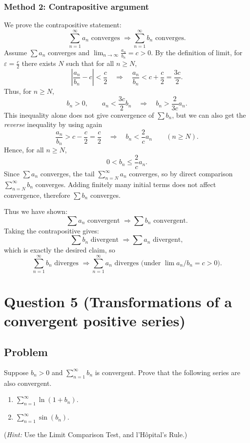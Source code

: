 \documentclass[12pt]{article}
\newcommand{\ds}{\displaystyle}
\begin{document}
\subsubsection*{Method 2: Contrapositive argument}
We prove the contrapositive statement:
\[
\sum_{n=1}^\infty a_n \text{ converges } \Longrightarrow \sum_{n=1}^\infty b_n \text{ converges}.
\]
Assume \(\sum a_n\) converges and \(\lim_{n\to\infty}\frac{a_n}{b_n}=c>0\).
By the definition of limit, for \(\varepsilon=\frac{c}{2}\) there exists \(N\) such that for all \(n\ge N\),
\[
\left|\frac{a_n}{b_n}-c\right|<\frac{c}{2}
\quad\Longrightarrow\quad
\frac{a_n}{b_n}<c+\frac{c}{2}=\frac{3c}{2}.
\]
Thus, for \(n\ge N\),
\[
b_n >0,\qquad a_n < \frac{3c}{2} b_n
\quad\Longrightarrow\quad
b_n > \frac{2}{3c} a_n.
\]
This inequality alone does not give convergence of \(\sum b_n\), but we can also get the \emph{reverse} inequality by using again
\[
\frac{a_n}{b_n}>c-\frac{c}{2}=\frac{c}{2}
\quad\Longrightarrow\quad
b_n < \frac{2}{c}a_n \qquad(n\ge N).
\]
Hence, for all \(n\ge N\),
\[
0<b_n \le \frac{2}{c} a_n.
\]
Since \(\sum a_n\) converges, the tail \(\sum_{n=N}^\infty a_n\) converges, so by direct comparison \(\sum_{n=N}^\infty b_n\) converges.
Adding finitely many initial terms does not affect convergence, therefore \(\sum b_n\) converges.

Thus we have shown:
\[
\sum a_n \text{ convergent } \Longrightarrow \sum b_n \text{ convergent}.
\]
Taking the contrapositive gives:
\[
\sum b_n \text{ divergent } \Longrightarrow \sum a_n \text{ divergent},
\]
which is exactly the desired claim, so
\[
\boxed{\sum_{n=1}^\infty b_n \text{ diverges } \Longrightarrow \sum_{n=1}^\infty a_n \text{ diverges (under } \lim a_n/b_n=c>0\text{)}.}
\]

\newpage
\section*{Question 5 (Transformations of a convergent positive series)}
\subsection*{Problem}
Suppose \(b_n>0\) and \(\sum_{n=1}^{\infty} b_n\) is convergent. Prove that the following series are also convergent.
\begin{enumerate}[label=(\roman*)]
  \item \(\ds \sum_{n=1}^{\infty}\ln(1+b_n)\).
  \item \(\ds \sum_{n=1}^{\infty}\sin(b_n)\).
\end{enumerate}
(\emph{Hint:} Use the Limit Comparison Test, and l'H\^opital's Rule.)
\end{document}
